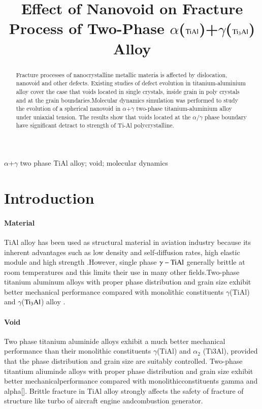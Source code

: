 \documentclass[times]{elsarticle}
\begin{document}
\begin{frontmatter}
\title{Effect of Nanovoid on Fracture Process of Two-Phase $\alpha$($\rm TiAl$)+$\gamma$($\rm Ti_3Al$) Alloy}

\address[mymainaddress]{School of Mechanical and Electronical Engineering, Lanzhou University of Technology. Lanzhou 730050, China}
\begin{abstract}
Fracture processes of nanocrystalline metallic materia is affected by dislocation, nanovoid and other defects. Existing studies of defect evolution in titanium-aluminium alloy cover the case that voids located in single crystals, inside grain in poly crystals and at the grain boundaries.Molecular dynamics simulation was performed to study the evolution of a spherical nanovoid in $\alpha$+$\gamma$ two-phase titanium-aluminium alloy under uniaxial tension. The results show that voids located at the $\alpha$/$\gamma$ phase boundary have significant detract to strength of Ti-Al polycrystalline.
\end{abstract}

\begin{keyword}
$\alpha$+$\gamma$ two phase TiAl alloy; void; molecular dynamics
\end{keyword}

\end{frontmatter}
\linenumbers

\section{Introduction}
\paragraph{Material}
TiAl alloy has been used as structural material in aviation industry because its inherent advantages such as low density and self-diffusion rates, high elastic module and high strength \cite{vu2013}.However, single phase $\gamma-\rm TiAl$ generally brittle at room temperatures and this limits their use in many other fields.Two-phase titanium aluminum alloys with proper phase distribution and grain size exhibit better mechanical performance compared with monolithic constituents $\gamma$(TiAl) and $\gamma$($\rm Ti_3Al$) alloy \cite{}.

\paragraph{Void}
Two phase titanium aluminide alloys exhibit a much better mechanical performance than their monolithic constituents $\gamma$(TiAl) and $\alpha_2$ (Ti3Al), provided that the phase distribution and grain size are suitably controlled. Two-phase titantium aliuminde alloys with proper phase distribution and grain size exhibit better mechanicalperformance compared with monolithicconstituents gamma and alpha[].
Brittle fracture in TiAl alloy strongly affects the safety of fracture of structure like turbo of aircraft engine andcombustion generator.
\end{document}
